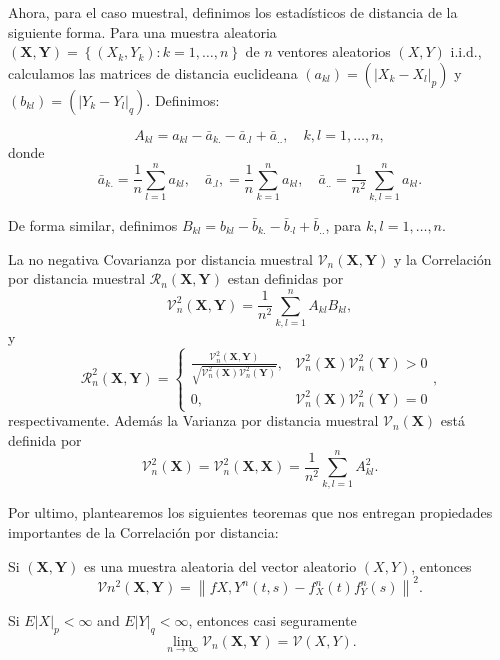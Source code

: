 	Ahora, para el caso muestral, definimos los estad\'isticos de distancia de la siguiente forma. Para una muestra aleatoria $(\mathbf{X}, \mathbf{Y})=\left\{\left(X_k, Y_k\right): k=1, \ldots, n\right\}$ de $n$ ventores aleatorios $(X, Y)$ i.i.d., calculamos las matrices de distancia euclideana  $\left(a_{k l}\right)=\left(\left|X_k-X_l\right|_p\right)$ y $\left(b_{k l}\right)=\left(\left|Y_k-Y_l\right|_q\right)$. Definimos:

	$$
	A_{k l}=a_{k l}-\bar{a}_{k .}-\bar{a}_{. l}+\bar{a}_{. .}, \quad k, l=1, \ldots, n,
	$$
	donde
	$$
	\bar{a}_{k .}=\frac{1}{n} \sum_{l=1}^n a_{k l}, \quad \bar{a}_{. l},=\frac{1}{n} \sum_{k=1}^n a_{k l}, \quad \bar{a}_{. .}=\frac{1}{n^2} \sum_{k, l=1}^n a_{k l} .
	$$
	
	De forma similar, definimos $B_{k l}=b_{k l}-\bar{b}_{k .}-\bar{b}_{\cdot l}+\bar{b}_{. .}$, para $k, l=1, \ldots, n$.

	\begin{defn}
		La no negativa Covarianza por distancia muestral $\mathcal{V}_n(\mathbf{X}, \mathbf{Y})$ y la Correlaci\'on por distancia muestral $\mathcal{R}_n(\mathbf{X}, \mathbf{Y})$ estan definidas por
		$$
		\mathcal{V}_n^2(\mathbf{X}, \mathbf{Y})=\frac{1}{n^2} \sum_{k, l=1}^n A_{k l} B_{k l},
		$$
		y
		$$
		\mathcal{R}_n^2(\mathbf{X}, \mathbf{Y})= \begin{cases}\frac{\mathcal{V}_n^2(\mathbf{X}, \mathbf{Y})}{\sqrt{\mathcal{V}_n^2(\mathbf{X}) \mathcal{V}_n^2(\mathbf{Y})}}, & \mathcal{V}_n^2(\mathbf{X}) \mathcal{V}_n^2(\mathbf{Y})>0 \\ 0, & \mathcal{V}_n^2(\mathbf{X}) \mathcal{V}_n^2(\mathbf{Y})=0\end{cases},
		$$
		respectivamente. Adem\'as la Varianza por distancia muestral $\mathcal{V}_n(\mathbf{X})$ est\'a definida por
		$$
		\mathcal{V}_n^2(\mathbf{X})=\mathcal{V}_n^2(\mathbf{X}, \mathbf{X})=\frac{1}{n^2} \sum_{k, l=1}^n A_{k l}^2 .
		$$
	\end{defn}

	Por ultimo, plantearemos los siguientes teoremas que nos entregan  propiedades importantes de la Correlaci\'on por distancia:

	\begin{thm}
		Si $(\mathbf{X}, \mathbf{Y})$ es una muestra aleatoria del vector aleatorio $(X, Y)$, entonces
		$$
		\mathcal{V}n^2(\mathbf{X}, \mathbf{Y})=\left\|f{X, Y}^n(t, s)-f_X^n(t) f_Y^n(s)\right\|^2 .
		$$
	\end{thm}
	\begin{thm}
		Si $E|X|_p<\infty$ and $E|Y|_q<\infty$, entonces casi seguramente
		$$
		\lim _{n \rightarrow \infty} \mathcal{V}_n(\mathbf{X}, \mathbf{Y})=\mathcal{V}(X, Y) .
		$$
	\end{thm}
	
